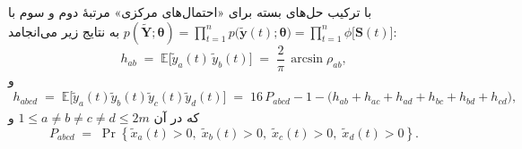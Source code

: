\begin{اثبات}
	
	با ترکیب حل‌های بسته برای «احتمال‌های  مرکزی» مرتبهٔ دوم و سوم با \linebreak
	$
	p(\tilde{\mathbf{Y}};\boldsymbol{\theta})
	= \prod_{t=1}^n p\bigl(\tilde{\mathbf{y}}(t);\boldsymbol{\theta}\bigr)
	= \prod_{t=1}^n \phi\bigl[\mathbf{S}(t)\bigr]
	$
	به نتایج زیر می‌انجامد:
	\begin{equation}
		h_{ab}\;=\;\mathbb{E}\!\big[\tilde y_{a}(t)\,\tilde y_{b}(t)\big]
		\;=\;\frac{2}{\pi}\,\arcsin \rho_{ab}, \label{eq:hab}
	\end{equation}
	و
	\begin{equation}
		\begin{aligned}
			h_{abcd}\;=\;\mathbb{E}\!\big[\tilde y_{a}(t)\tilde y_{b}(t)\tilde y_{c}(t)\tilde y_{d}(t)\big]
			\;=\;16\,P_{abcd}-1
			-\big(h_{ab}+h_{ac}+h_{ad}+h_{bc}+h_{bd}+h_{cd}\big),
		\end{aligned} \label{eq:habcd}
	\end{equation}
	که در آن \(1\le a\neq b\neq c\neq d\le 2m\) و
	\begin{equation}
		P_{abcd}\;=\;\Pr\!\left\{ \tilde x_{a}(t)>0,\;\tilde x_{b}(t)>0,\;\tilde x_{c}(t)>0,\;\tilde x_{d}(t)>0 \right\}.
	\end{equation}
	

\end{اثبات}
